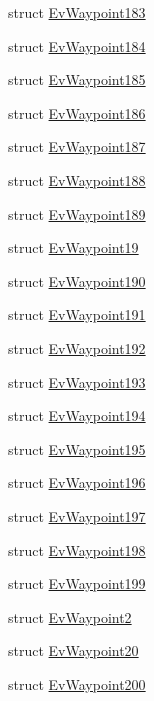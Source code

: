 \begin{DoxyCompactItemize}
struct \hyperlink{structmove__base__z__client_1_1EvWaypoint183}{Ev\+Waypoint183}
\item 
struct \hyperlink{structmove__base__z__client_1_1EvWaypoint184}{Ev\+Waypoint184}
\item 
struct \hyperlink{structmove__base__z__client_1_1EvWaypoint185}{Ev\+Waypoint185}
\item 
struct \hyperlink{structmove__base__z__client_1_1EvWaypoint186}{Ev\+Waypoint186}
\item 
struct \hyperlink{structmove__base__z__client_1_1EvWaypoint187}{Ev\+Waypoint187}
\item 
struct \hyperlink{structmove__base__z__client_1_1EvWaypoint188}{Ev\+Waypoint188}
\item 
struct \hyperlink{structmove__base__z__client_1_1EvWaypoint189}{Ev\+Waypoint189}
\item 
struct \hyperlink{structmove__base__z__client_1_1EvWaypoint19}{Ev\+Waypoint19}
\item 
struct \hyperlink{structmove__base__z__client_1_1EvWaypoint190}{Ev\+Waypoint190}
\item 
struct \hyperlink{structmove__base__z__client_1_1EvWaypoint191}{Ev\+Waypoint191}
\item 
struct \hyperlink{structmove__base__z__client_1_1EvWaypoint192}{Ev\+Waypoint192}
\item 
struct \hyperlink{structmove__base__z__client_1_1EvWaypoint193}{Ev\+Waypoint193}
\item 
struct \hyperlink{structmove__base__z__client_1_1EvWaypoint194}{Ev\+Waypoint194}
\item 
struct \hyperlink{structmove__base__z__client_1_1EvWaypoint195}{Ev\+Waypoint195}
\item 
struct \hyperlink{structmove__base__z__client_1_1EvWaypoint196}{Ev\+Waypoint196}
\item 
struct \hyperlink{structmove__base__z__client_1_1EvWaypoint197}{Ev\+Waypoint197}
\item 
struct \hyperlink{structmove__base__z__client_1_1EvWaypoint198}{Ev\+Waypoint198}
\item 
struct \hyperlink{structmove__base__z__client_1_1EvWaypoint199}{Ev\+Waypoint199}
\item 
struct \hyperlink{structmove__base__z__client_1_1EvWaypoint2}{Ev\+Waypoint2}
\item 
struct \hyperlink{structmove__base__z__client_1_1EvWaypoint20}{Ev\+Waypoint20}
\item 
struct \hyperlink{structmove__base__z__client_1_1EvWaypoint200}{Ev\+Waypoint200}

\end{DoxyCompactItemize}
